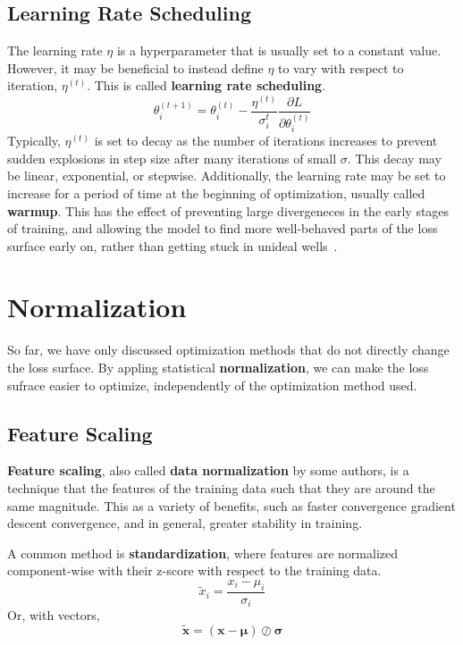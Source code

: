 \documentclass[12pt]{report}
\theoremstyle{definition}
\theoremstyle{remark}
\begin{document}
\subsection{Learning Rate Scheduling}

The learning rate $\eta$ is a hyperparameter that is usually set to a constant value. However, it may be beneficial to instead define $\eta$ to vary with respect to iteration, $\eta^{(t)}$. This is called \textbf{learning rate scheduling}.
\begin{equation}
    \theta_{i}^{(t+1)} = \theta_{i}^{(t)} - \frac{\eta^{(t)}}{\sigma_i^t}\frac{\partial L}{\partial \theta_i^{(t)}}
\end{equation}
Typically, $\eta^{(t)}$ is set to decay as the number of iterations increases to prevent sudden explosions in step size after many iterations of small $\sigma$. This decay may be linear, exponential, or stepwise. Additionally, the learning rate may be set to increase for a period of time at the beginning of optimization, usually called \textbf{warmup}. This has the effect of preventing large divergeneces in the early stages of training, and allowing the model to find more well-behaved parts of the loss surface early on, rather than getting stuck in unideal wells~\cite{liu_variance_2021, kalra_why_2024}.

\section{Normalization}
So far, we have only discussed optimization methods that do not directly change the loss surface. By appling statistical \textbf{normalization}, we can make the loss sufrace easier to optimize, independently of the optimization method used.

\subsection{Feature Scaling}
\textbf{Feature scaling}, also called \textbf{data normalization} by some authors, is a technique that the features of the training data such that they are around the same magnitude. This as a variety of benefits, such as faster convergence gradient descent convergence, and in general, greater stability in training.

A common method is \textbf{standardization}, where features are normalized component-wise with their z-score with respect to the training data.
\begin{equation}
    \tilde{x}_i = \frac{x_i - \mu_i}{\sigma_i}
\end{equation}
Or, with vectors,
\begin{equation}
    \tilde{\mathbf{x}} = (\mathbf{x} - \boldsymbol{\mu}) \oslash \boldsymbol{\sigma}
\end{equation}
\end{document}
